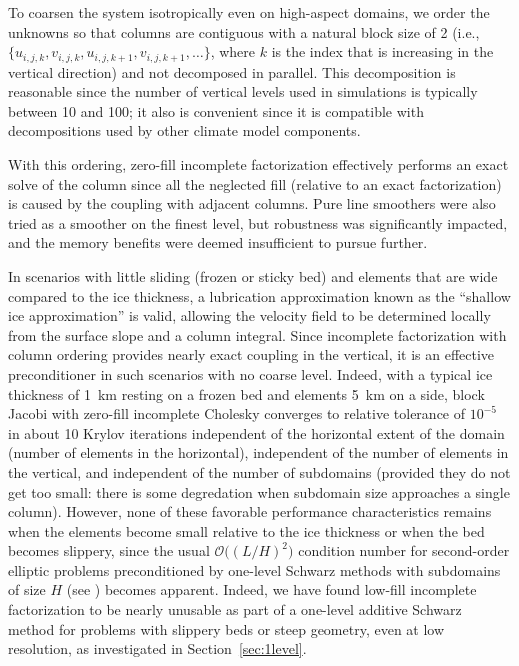 \documentclass[3p]{elsarticle}
\newcommand{\bigO}{{\mathcal{O}}}
\begin{document}
To coarsen the system isotropically even on high-aspect domains, we order the unknowns so that columns
are contiguous with a natural block size of 2
(i.e., $\{u_{i,j,k},v_{i,j,k},u_{i,j,k+1},v_{i,j,k+1},\dotsc\}$, where $k$ is the index that is
increasing in the vertical direction) and not decomposed in parallel.  This decomposition is
reasonable since the number of vertical levels used in simulations is typically between 10 and 100;
it also is convenient since it is compatible with decompositions used by other climate model components.

With this ordering, zero-fill incomplete factorization effectively performs an exact solve of the
column since all the neglected fill (relative to an exact factorization) is caused by the coupling
with adjacent columns.  Pure line smoothers were also tried as a smoother on the finest level, but
robustness was significantly impacted, and the memory benefits were deemed insufficient to pursue
further.

In scenarios with little sliding (frozen or sticky bed) and elements that are wide compared to the
ice thickness, a lubrication approximation known as the ``shallow ice approximation'' is valid,
allowing the velocity field to be determined locally from the surface slope and a column integral.
Since incomplete factorization with column ordering provides nearly exact coupling in the vertical,
it is an effective preconditioner in such scenarios with no coarse level.  Indeed, with a typical
ice thickness of \SI{1}{\kilo\metre} resting on a frozen bed and elements \SI{5}{\kilo\metre} on
a side, block Jacobi with zero-fill incomplete Cholesky converges to relative tolerance of $10^{-5}$
in about 10 Krylov iterations independent of the horizontal extent of the domain (number of elements
in the horizontal), independent of the number of elements in the vertical, and independent of the
number of subdomains (provided they do not get too small: there is some degredation when subdomain
size approaches a single column).  However, none of these favorable performance characteristics
remains when the elements become small relative to the ice thickness or when the bed becomes
slippery, since the usual $\bigO\big((L/H)^2\big)$ condition number for second-order elliptic problems
preconditioned by one-level Schwarz methods with subdomains of size $H$ (see \cite{smith1996domain}) becomes apparent.
Indeed, we have found low-fill incomplete factorization to be nearly unusable as part of a one-level additive Schwarz method for problems with slippery beds or steep geometry, even at low resolution, as investigated in Section~\ref{sec:1level}.
\end{document}
